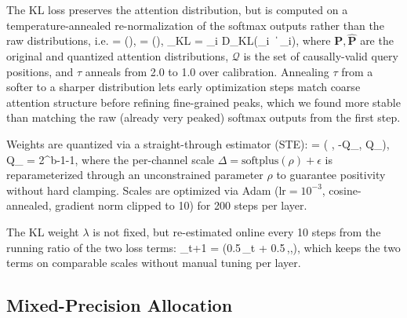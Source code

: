 \documentclass[10pt,twocolumn,letterpaper]{article}
\let\oldequation\equation
\let\oldendequation\endequation
\renewenvironment{equation}{\oldequation\small}{\oldendequation}
\begin{document}
The KL loss preserves the attention distribution, but is computed on a temperature-annealed re-normalization of the softmax outputs rather than the raw distributions, i.e.
\begin{equation}
 = \!\left(\right), \qquad
{} = \!\left(\right),
\end{equation}
\begin{equation}
_{KL} = \sum_{i \in {}} D_{KL}\!\left(_i \,\|\, _i\right),
\end{equation}
where $\mathbf{P}, \hat{\mathbf{P}}$ are the original and quantized attention distributions, $\mathcal{Q}$ is the set of causally-valid query positions, and $\tau$ anneals from 2.0 to 1.0 over calibration. Annealing $\tau$ from a softer to a sharper distribution lets early optimization steps match coarse attention structure before refining fine-grained peaks, which we found more stable than matching the raw (already very peaked) softmax outputs from the first step.

Weights are quantized via a straight-through estimator (STE):
\begin{equation}
 = \Delta \cdot {}\left(\left\lfloor {} \right\rceil, -Q_{\max}, Q_{\max}\right), \qquad Q_{\max} = 2^{b-1}-1,
\end{equation}
where the per-channel scale $\Delta = \mathrm{softplus}(\rho) + \epsilon$ is reparameterized through an unconstrained parameter $\rho$ to guarantee positivity without hard clamping. Scales are optimized via Adam ($\mathrm{lr}=10^{-3}$, cosine-annealed, gradient norm clipped to 10) for 200 steps per layer.

The KL weight $\lambda$ is not fixed, but re-estimated online every 10 steps from the running ratio of the two loss terms:
\begin{equation}
\lambda_{t+1} = \!\left(0.5\,\lambda_t + 0.5\,,,\right),
\end{equation}
which keeps the two terms on comparable scales without manual tuning per layer.

\subsection{Mixed-Precision Allocation}
\end{document}
